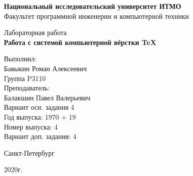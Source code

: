 \thispagestyle{empty}
\begin{center}
    {\bfseries Национальный исследовательский университет ИТМО}\\
    Факультет программной инженерии и компьютерной техники

    \vspace{20em}

    {\large Лабораторная работа }\\
    {\Large \textbf{Работа с системой компьютерной вёрстки \TeX}}
\end{center}

\vspace{15em}

\begin{flushright}
    Выполнил:\\
    Бавыкин Роман Алексеевич\\
    Группа P3110\\
    Преподаватель:\\
    Балакшин Павел Валерьевич\\
    Вариант осн. задания 4\\
    Год выпуска: 1970 + 19\\
    Номер выпуска: 4 \\
    Вариант доп. задания: 4 
\end{flushright}

\vspace{\fill}

\begin{center}
Санкт-Петербург

2020г.
\end{center}
